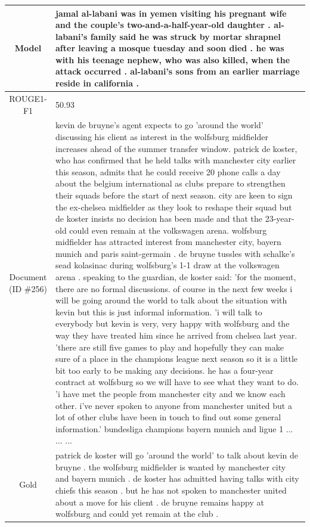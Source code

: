 \begin{table}[bth!]
\begin{tabular}{c|p{}}
\\ \hline
Model & 
jamal al-labani was in yemen visiting his pregnant wife and the couple's two-and-a-half-year-old daughter . al-labani's family said he was struck by mortar shrapnel after leaving a mosque tuesday and soon died . he was with his teenage nephew, who was also killed, when the attack occurred . al-labani's sons from an earlier marriage reside in california .
\\ \hline
ROUGE1-F1 & 
50.93
\\ \hline
\makecell{Document\\(ID \#256)} & 
kevin de bruyne's agent expects to go 'around the world' discussing his client as interest in the wolfsburg midfielder increases ahead of the summer transfer window. patrick de koster, who has confirmed that he held talks with manchester city earlier this season, admits that he could receive 20 phone calls a day about the belgium international as clubs prepare to strengthen their squads before the start of next season. city are keen to sign the ex-chelsea midfielder as they look to reshape their squad but de koster insists no decision has been made and that the 23-year-old could even remain at the volkswagen arena. wolfsburg midfielder has attracted interest from manchester city, bayern munich and paris saint-germain . de bruyne tussles with schalke's sead kolasinac during wolfsburg's 1-1 draw at the volkswagen arena . speaking to the guardian, de koster said: 'for the moment, there are no formal discussions. of course in the next few weeks i will be going around the world to talk about the situation with kevin but this is just informal information. 'i will talk to everybody but kevin is very, very happy with wolfsburg and the way they have treated him since he arrived from chelsea last year. 'there are still five games to play and hopefully they can make sure of a place in the champions league next season so it is a little bit too early to be making any decisions. he has a four-year contract at wolfsburg so we will have to see what they want to do. 'i have met the people from manchester city and we know each other. i've never spoken to anyone from manchester united but a lot of other clubs have been in touch to find out some general information.' bundesliga champions bayern munich and ligue 1 ... ... ... 
\\ \hline
Gold & 
patrick de koster will go 'around the world' to talk about kevin de bruyne . the wolfsburg midfielder is wanted by manchester city and bayern munich . de koster has admitted having talks with city chiefs this season . but he has not spoken to manchester united about a move for his client . de bruyne remains happy at wolfsburg and could yet remain at the club .

\end{tabular}
\end{table}
